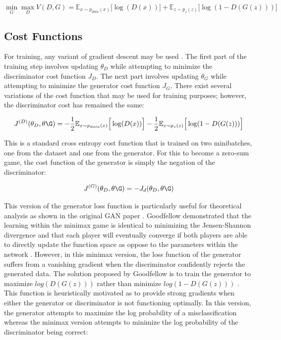 \documentclass[11pt]{article}
\begin{document}
$$\min_{G}\max_{D}V(D, G) = \mathbb{E}_{x\sim p_{data}(x)}\Big[\log(D(x))\Big] + \mathbb{E}_{z\sim p_z(z)}\Big[\log(1-D(G(z)))\Big]$$

\subsection{Cost Functions}
For training, any variant of gradient descent may be used \citep{2017arXiv170100160G}. The first part of the training step involves updating $\theta_D$ while attempting to minimize the discriminator cost function $J_D$. The next part involves updating $\theta_G$ while attempting to minimize the generator cost function $J_G$. There exist several variations of the cost function that may be used for training purposes; however, the discriminator cost has remained the same:

$$J^{(D)}(\theta_D,\theta\G) = -\frac{1}{2}\mathbb{E}_{x\sim p_{data}(x)}\Big[\log(D(x))\Big] - \frac{1}{2}\mathbb{E}_{z\sim p_{z}(z)}\Big[\log(1-D(G(z)))\Big]$$

This is a standard cross entropy cost function that is trained on two minibatches, one from the dataset and one from the generator. For this to become a zero-sum game, the cost function of the generator is simply the negation of the discriminator:

$$J^{(G)}(\theta_D,\theta\G) = -J_d(\theta_D,\theta\G)$$

This version of the generator loss function is particularly useful for theoretical analysis as shown in the original GAN paper \citep{2014arXiv1406.2661G}. Goodfellow demonstrated that the learning within the minimax game is identical to minimizing the Jensen-Shannon divergence and that each player will eventually converge if both players are able to directly update the function space as oppose to the parameters within the network \citep{2017arXiv170100160G}. However, in this minimax version, the loss function of the generator suffers from a vanishing gradient when the discriminator confidently rejects the generated data. The solution proposed by Goodfellow is to train the generator to maximize $log(D(G(z)))$ rather than minimize $log(1-D(G(z)))$ \citep{2014arXiv1406.2661G}. This function is heuristically motivated as to provide strong gradients when either the generator or discriminator is not functioning optimally. In this version, the generator attempts to maximize the log probability of a misclassification whereas the minimax version attempts to minimize the log probability of the discriminator being correct:
\end{document}
